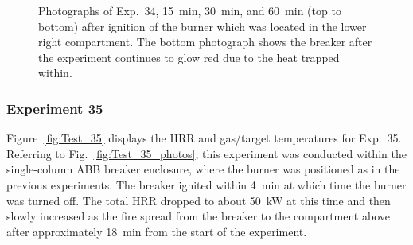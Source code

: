 \begin{figure}[p]
\caption[Photographs of Exp.~34]{Photographs of Exp.~34, 15~min, 30~min, and 60~min (top to bottom) after ignition of the burner which was located in the lower right compartment. The bottom photograph shows the breaker after the experiment continues to glow red due to the heat trapped within.}
\label{fig:Test_34_photos}
\end{figure}


\clearpage

\subsubsection{Experiment 35}

Figure~\ref{fig:Test_35} displays the HRR and gas/target temperatures for Exp.~35. Referring to Fig.~\ref{fig:Test_35_photos}, this experiment was conducted within the single-column ABB breaker enclosure, where the burner was positioned as in the previous experiments. The breaker ignited within 4~min at which time the burner was turned off. The total HRR dropped to about 50~kW at this time and then slowly increased as the fire spread from the breaker to the compartment above after approximately 18~min from the start of the experiment.

